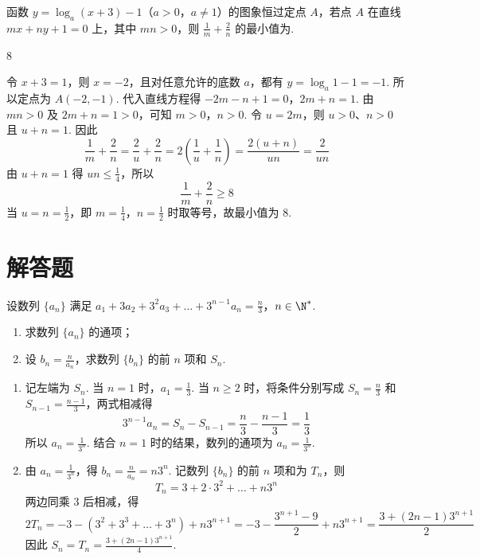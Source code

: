 \begin{problem}
函数 \( y = \log_a(x + 3) - 1 \)（\(a > 0\)，\(a \neq 1\)）的图象恒过定点 \(A\)，若点 \(A\) 在直线 \( mx + ny + 1 = 0 \) 上，其中 \( mn > 0 \)，则 \( \frac{1}{m} + \frac{2}{n} \) 的最小值为\fillinblank{}.

\begin{answer}\(8\)\end{answer}

\begin{solution}
令 \(x+3=1\)，则 \(x=-2\)，且对任意允许的底数 \(a\)，都有 \(y=\log_a1-1=-1\). 所以定点为 \(A(-2,-1)\). 代入直线方程得
\(-2m-n+1=0\)，\(2m+n=1\).
由 \(mn>0\) 及 \(2m+n=1>0\)，可知 \(m>0\)，\(n>0\). 令 \(u=2m\)，则 \(u>0\)、\(n>0\) 且 \(u+n=1\). 因此
\[
\frac{1}{m}+\frac{2}{n}=\frac{2}{u}+\frac{2}{n}=2\left(\frac{1}{u}+\frac{1}{n}\right)=\frac{2(u+n)}{un}=\frac{2}{un}
\]
由 \(u+n=1\) 得 \(un\leqslant\frac{1}{4}\)，所以
\[
\frac{1}{m}+\frac{2}{n}\geqslant8
\]
当 \(u=n=\frac{1}{2}\)，即 \(m=\frac{1}{4}\)，\(n=\frac{1}{2}\) 时取等号，故最小值为 \(8\).
\end{solution}
\end{problem}

\section{解答题}

\begin{problem}
设数列 \(\{a_{n}\}\) 满足 \(a_1 + 3a_2 + 3^2 a_3 + \dots + 3^{n-1} a_n = \frac{n}{3}\)，\(n \in \N^*\).

\begin{enumerate}
\item 求数列 \(\{a_{n}\}\) 的通项；
\item 设 \( b_{n}=\frac{n}{a_{n}} \)，求数列 \(\{b_{n}\}\) 的前 \(n\) 项和 \( S_{n} \).
\end{enumerate}
\end{problem}

\begin{solution}
\begin{enumerate}
\item 记左端为 \(S_n\). 当 \(n=1\) 时，\(a_1=\frac{1}{3}\). 当 \(n\geqslant2\) 时，将条件分别写成 \(S_n=\frac{n}{3}\) 和 \(S_{n-1}=\frac{n-1}{3}\)，两式相减得
\[
3^{n-1}a_n=S_n-S_{n-1}=\frac{n}{3}-\frac{n-1}{3}=\frac{1}{3}
\]
所以 \(a_n=\frac{1}{3^n}\). 结合 \(n=1\) 时的结果，数列的通项为 \(a_n=\frac{1}{3^n}\).
\item 由 \(a_n=\frac{1}{3^n}\)，得 \(b_n=\frac{n}{a_n}=n3^n\). 记数列 \(\{b_n\}\) 的前 \(n\) 项和为 \(T_n\)，则
\[
T_n=3+2\cdot3^2+\dots+n3^n
\]
两边同乘 \(3\) 后相减，得
\[
2T_n=-3-(3^2+3^3+\dots+3^n)+n3^{n+1}=-3-\frac{3^{n+1}-9}{2}+n3^{n+1}=\frac{3+(2n-1)3^{n+1}}{2}
\]
因此 \(S_n=T_n=\frac{3+(2n-1)3^{n+1}}{4}\).
\end{enumerate}
\end{solution}

